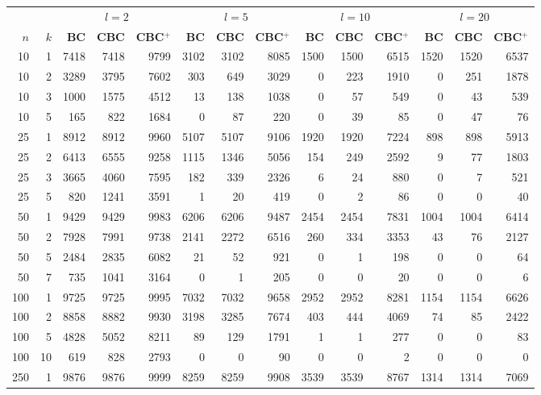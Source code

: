 \begin{table}
  \begin{center}
  \scriptsize
  \begin{tabular}{|rr | rrr| rrr| rrr| rrr|}
  \hline
   &&\multicolumn{3}{c|}{$l=2$} &\multicolumn{3}{c|}{$l=5$} &\multicolumn{3}{c|}{$l=10$} &\multicolumn{3}{c|}{$l=20$}\\
   \bfseries $n$ & \bfseries $k$
& \bfseries BC & \bfseries CBC & \bfseries CBC$^+$
& \bfseries BC & \bfseries CBC & \bfseries CBC$^+$
& \bfseries BC & \bfseries CBC & \bfseries CBC$^+$
& \bfseries BC & \bfseries CBC & \bfseries CBC$^+$
\\\hline
10&1&
7418&7418&9799&3102&3102&8085&1500&1500&6515&1520&1520&6537\\
10&2&
\cellcolor[gray]{0.85}3289&\cellcolor[gray]{0.85}3795&7602&      303& 649&3029&    0& 223&1910&      0&251&1878\\
10&3&
\cellcolor[gray]{0.85}1000&\cellcolor[gray]{0.85}1575&4512&13&138&1038&0&57&549&0&43&539\\
10&5&
\cellcolor[gray]{0.85}165&\cellcolor[gray]{0.85}822&1684&0&87&220&0&39&85&0&47&76\\
\hline
25&1&
8912&8912&9960&5107&5107&9106&1920&1920&7224&898&898&5913\\
25&2&
6413&6555&9258&       1115&1346&5056&        154&249&2592&            9&77&1803\\
25&3&
3665&4060&7595&182&339&2326&6&24&880&0&7&521\\
25&5&
\cellcolor[gray]{0.85}820&\cellcolor[gray]{0.85}1241&3591&1&20&419&0&2&86&0&0&40\\
\hline
50&1&
9429&9429&9983&6206&6206&9487&2454&2454&7831&1004&1004&6414\\
50&2&
7928&7991&9738&                    2141&2272&6516&          260&334&3353&          43&76&2127\\
50&5&
2484&2835&6082&           21&52&921&         0&1&198&           0&0&64\\
50&7&
735&1041&3164&          0&1&205&     0&0&20&             0&0&6\\
\hline
100&1&
9725&9725&9995&7032&7032&9658&2952&2952&8281&1154&1154&6626\\
100&2&
8858&8882&9930&3198&3285&7674&403&444&4069&74&85&2422\\
100&5&
4828&5052&8211&89&129&1791&1&1&277&0&0&83\\
100&10&
619&828&2793&0&0&90&0&0&2&0&0&0\\
\hline
250&1&
9876&9876&9999&8259&8259&9908&3539&3539&8767&1314&1314&7069\\

\end{tabular}
\end{center}
\end{table}
